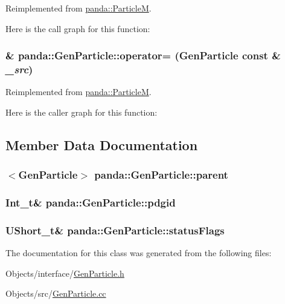 Reimplemented from \hyperlink{classpanda_1_1ParticleM_a042f9e295576be022960ea88144e9022}{panda::ParticleM}.

Here is the call graph for this function:\hypertarget{classpanda_1_1GenParticle_a46eed568bb72468ccda95c09002ea6a5}{
\subsubsection[{operator=}]{ \& panda::GenParticle::operator= ({\bf GenParticle} const \& {\em \_\-src})}}
\label{classpanda_1_1GenParticle_a46eed568bb72468ccda95c09002ea6a5}


Reimplemented from \hyperlink{classpanda_1_1ParticleM_a37f7be4e1150b6080b47b005af730af5}{panda::ParticleM}.

Here is the caller graph for this function:

\subsection{Member Data Documentation}
\hypertarget{classpanda_1_1GenParticle_a478bb0f7a51e96f83b9593acf76279ca}{
\subsubsection[{parent}]{$<${\bf GenParticle}$>$ {\bf panda::GenParticle::parent}}}
\label{classpanda_1_1GenParticle_a478bb0f7a51e96f83b9593acf76279ca}
\hypertarget{classpanda_1_1GenParticle_aab60b403c96f228bfabbb5e5c338126b}{
\subsubsection[{pdgid}]{\setlength{\rightskip}{0pt plus 5cm}Int\_\-t\& {\bf panda::GenParticle::pdgid}}}
\label{classpanda_1_1GenParticle_aab60b403c96f228bfabbb5e5c338126b}
\hypertarget{classpanda_1_1GenParticle_af2b7ee2bf756391419ab702b7dfd2b3a}{
\subsubsection[{statusFlags}]{\setlength{\rightskip}{0pt plus 5cm}UShort\_\-t\& {\bf panda::GenParticle::statusFlags}}}
\label{classpanda_1_1GenParticle_af2b7ee2bf756391419ab702b7dfd2b3a}


The documentation for this class was generated from the following files:\begin{DoxyCompactItemize}
\item 
Objects/interface/\hyperlink{GenParticle_8h}{GenParticle.h}\item 
Objects/src/\hyperlink{GenParticle_8cc}{GenParticle.cc}\end{DoxyCompactItemize}
